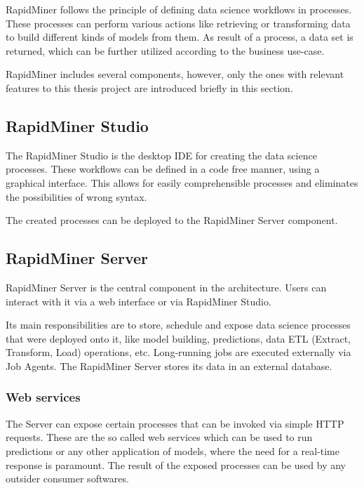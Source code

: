 RapidMiner follows the principle of defining data science workflows in processes. These processes can perform various actions like retrieving or transforming data to build different kinds of models from them. As result of a process, a data set is returned, which can be further utilized according to the business use-case.

RapidMiner includes several components, however, only the ones with relevant features to this thesis project are introduced briefly in this section. \cite{rapidminer-server-arch}

\subsection{RapidMiner Studio}

The RapidMiner Studio is the desktop IDE for creating the data science processes. These workflows can be defined in a code free manner, using a graphical interface. This allows for easily comprehensible processes and eliminates the possibilities of wrong syntax.

The created processes can be deployed to the RapidMiner Server component.

\subsection{RapidMiner Server}

RapidMiner Server is the central component in the architecture. Users can interact with it via a web interface or via RapidMiner Studio.

Its main responsibilities are to store, schedule and expose data science processes that were deployed onto it, like model building, predictions, data ETL (Extract, Transform, Load) operations, etc. Long-running jobs are executed externally via Job Agents. The RapidMiner Server stores its data in an external database.

\subsubsection{Web services}
The Server can expose certain processes that can be invoked via simple HTTP requests. These are the so called web services which can be used to run predictions or any other application of models, where the need for a real-time response is paramount. The result of the exposed processes can be used by any outsider consumer softwares.

